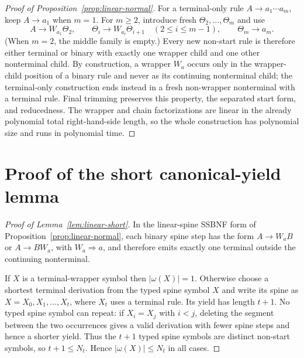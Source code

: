 \documentclass[11pt,a4paper]{article}
\theoremstyle{remark}
\theoremstyle{plain}
\begin{document}
\begin{proof}[Proof of Proposition~\ref{prop:linear-normal}]
For a terminal-only rule $A\to a_1\cdots a_m$, keep $A\to a_1$ when
$m=1$.  For $m\ge2$, introduce fresh
$\Theta_2,\ldots,\Theta_m$ and use
\[
 A\to W_{a_1}\Theta_2,\qquad
 \Theta_i\to W_{a_i}\Theta_{i+1}\quad(2\le i\le m-1),\qquad
 \Theta_m\to a_m.
\]
(When $m=2$, the middle family is empty.)  Every new non-start rule is
therefore either terminal or binary with exactly one wrapper child and one
other nonterminal child.  By construction, a wrapper $W_a$ occurs only in the
wrapper-child position of a binary rule and never as its continuing
nonterminal child; the terminal-only construction ends instead in a fresh non-wrapper
nonterminal with a terminal rule.  Final trimming preserves this property,
the separated start form, and reducedness.  The wrapper and chain
factorizations are linear in the already polynomial total right-hand-side
length, so the whole construction has polynomial size and runs in polynomial
time.
\end{proof}

\section{Proof of the short canonical-yield lemma}
\label{app:linear-short-proof}

\begin{proof}[Proof of Lemma~\ref{lem:linear-short}]
In the linear-spine SSBNF form of
Proposition~\ref{prop:linear-normal}, each binary spine step has the form
$A\to W_aB$ or $A\to BW_a$, with $W_a\Rightarrow a$, and therefore emits
exactly one terminal outside the continuing nonterminal.

If $X$ is a terminal-wrapper symbol then $|\omega(X)|=1$.  Otherwise choose
a shortest terminal derivation from the typed spine symbol $X$ and write its
spine as $X=X_0,X_1,\ldots,X_t$, where $X_t$ uses a terminal rule.  Its
yield has length $t+1$.  No typed spine symbol can repeat: if
$X_i=X_j$ with $i<j$, deleting the segment between the two occurrences gives
a valid derivation with fewer spine steps and hence a shorter yield.  Thus the
$t+1$ typed spine symbols are distinct non-start symbols, so
$t+1\le N_t$.  Hence $|\omega(X)|\le N_t$ in all cases.
\end{proof}
\end{document}

